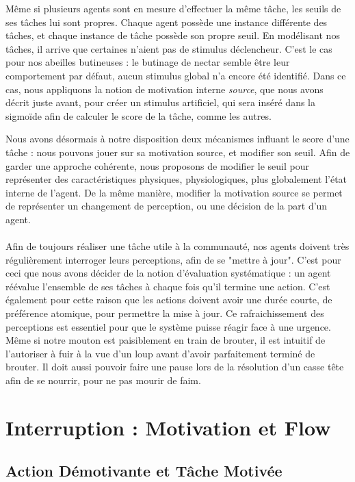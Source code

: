			Même si plusieurs agents sont en mesure d'effectuer la même tâche, les seuils de ses tâches lui sont propres. Chaque agent possède une instance différente des tâches, et chaque instance de tâche possède son propre seuil. En modélisant nos tâches, il arrive que certaines n'aient pas de stimulus déclencheur. C'est le cas pour nos abeilles butineuses : le butinage de nectar semble être leur comportement par défaut, aucun stimulus global n'a encore été identifié. Dans ce cas, nous appliquons la notion de motivation interne \textit{source}, que nous avons décrit juste avant, pour créer un stimulus artificiel, qui sera inséré dans la sigmoïde afin de calculer le score de la tâche, comme les autres.
			
			Nous avons désormais à notre disposition deux mécanismes influant le score d'une tâche : nous pouvons jouer sur sa motivation source, et modifier son seuil. Afin de garder une approche cohérente, nous proposons de modifier le seuil pour représenter des caractéristiques physiques, physiologiques, plus globalement l'état interne de l'agent. De la même manière, modifier la motivation source se permet de représenter un changement de perception, ou une décision de la part d'un agent.
			
			\paragraph{}
			Afin de toujours réaliser une tâche utile à la communauté, nos agents doivent très régulièrement interroger leurs perceptions, afin de se "mettre à jour". C'est pour ceci que nous avons décider de la notion d'évaluation systématique : un agent réévalue l'ensemble de ses tâches à chaque fois qu'il termine une action. C'est également pour cette raison que les actions doivent avoir une durée courte, de préférence atomique, pour permettre la mise à jour. Ce rafraichissement des perceptions est essentiel pour que le système puisse réagir face à une urgence. Même si notre mouton est paisiblement en train de brouter, il est intuitif de l'autoriser à fuir à la vue d'un loup avant d'avoir parfaitement terminé de brouter. Il doit aussi pouvoir faire une pause lors de la résolution d'un casse tête afin de se nourrir, pour ne pas mourir de faim.
		
	\section{Interruption : Motivation et Flow}
	\label{sectionInterruption}
		\subsection{Action Démotivante et Tâche Motivée}
		

